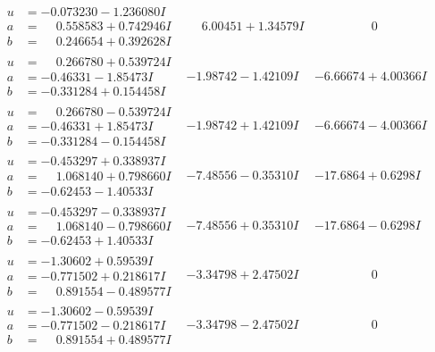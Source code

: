 \documentclass[1p]{elsarticle_modified}
\theoremstyle{definition}
\begin{document}
$$\begin{array}{c|c|c}
\begin{aligned}
u &= -0.073230 - 1.236080 I \\
a &= \phantom{-}0.558583 + 0.742946 I \\
b &= \phantom{-}0.246654 + 0.392628 I\end{aligned}
 & \phantom{-}6.00451 + 1.34579 I & \phantom{-0.000000 } 0 \\ \hline\begin{aligned}
u &= \phantom{-}0.266780 + 0.539724 I \\
a &= -0.46331 - 1.85473 I \\
b &= -0.331284 + 0.154458 I\end{aligned}
 & -1.98742 - 1.42109 I & -6.66674 + 4.00366 I \\ \hline\begin{aligned}
u &= \phantom{-}0.266780 - 0.539724 I \\
a &= -0.46331 + 1.85473 I \\
b &= -0.331284 - 0.154458 I\end{aligned}
 & -1.98742 + 1.42109 I & -6.66674 - 4.00366 I \\ \hline\begin{aligned}
u &= -0.453297 + 0.338937 I \\
a &= \phantom{-}1.068140 + 0.798660 I \\
b &= -0.62453 - 1.40533 I\end{aligned}
 & -7.48556 - 0.35310 I & -17.6864 + 0.6298 I \\ \hline\begin{aligned}
u &= -0.453297 - 0.338937 I \\
a &= \phantom{-}1.068140 - 0.798660 I \\
b &= -0.62453 + 1.40533 I\end{aligned}
 & -7.48556 + 0.35310 I & -17.6864 - 0.6298 I \\ \hline\begin{aligned}
u &= -1.30602 + 0.59539 I \\
a &= -0.771502 + 0.218617 I \\
b &= \phantom{-}0.891554 - 0.489577 I\end{aligned}
 & -3.34798 + 2.47502 I & \phantom{-0.000000 } 0 \\ \hline\begin{aligned}
u &= -1.30602 - 0.59539 I \\
a &= -0.771502 - 0.218617 I \\
b &= \phantom{-}0.891554 + 0.489577 I\end{aligned}
 & -3.34798 - 2.47502 I & \phantom{-0.000000 } 0 \\ \hline\begin{aligned}

\end{aligned}
\end{array}$$
\end{document}

